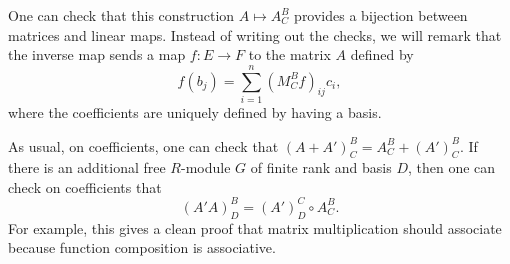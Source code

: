 \documentclass[../notes.tex]{subfiles}
\begin{document}
\begin{remark}
	One can check that this construction $A\mapsto A^B_C$ provides a bijection between matrices and linear maps. Instead of writing out the checks, we will remark that the inverse map sends a map $f\colon E\to F$ to the matrix $A$ defined by
	\[f(b_j)=\sum_{i=1}^n(M^B_Cf)_{ij}c_i,\]
	where the coefficients are uniquely defined by having a basis.
\end{remark}
\begin{remark}
	As usual, on coefficients, one can check that $(A+A')^B_C=A^B_C+(A')^B_C$. If there is an additional free $R$-module $G$ of finite rank and basis $D$, then one can check on coefficients that
	\[(A'A)^B_D=(A')^C_D\circ A^B_C.\]
	For example, this gives a clean proof that matrix multiplication should associate because function composition is associative.
\end{remark}
\end{document}
